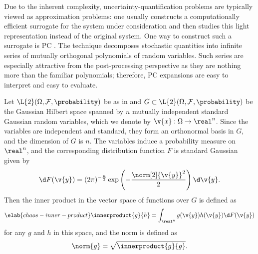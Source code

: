 Due to the inherent complexity, uncertainty-quantification problems are
typically viewed as approximation problems: one usually constructs a
computationally efficient surrogate for the system under consideration and then
studies this light representation instead of the original system. One way to
construct such a surrogate is \acf{PC} \cite{xiu2010}. The technique decomposes
stochastic quantities into infinite series of mutually orthogonal polynomials of
random variables. Such series are especially attractive from the post-processing
perspective as they are nothing more than the familiar polynomials; therefore,
\ac{PC} expansions are easy to interpret and easy to evaluate.

Let $\L{2}(\Omega, \mathcal{F}, \probability)$ be as in
 and $G \subset \L{2}(\Omega, \mathcal{F},
\probability)$ be the Gaussian Hilbert space \cite{janson1997} spanned by $n$
mutually independent standard Gaussian random variables, which we denote by
$\v{x}: \Omega \to \real^n$. Since the variables are independent and standard,
they form an orthonormal basis in $G$, and the dimension of $G$ is $n$. The
variables induce a probability measure on $\real^n$, and the corresponding
distribution function $F$ is standard Gaussian given by
\[
  \d F(\v{y}) = (2 \pi)^{-\frac{n}{2}} \exp\left(-\frac{\norm[2]{\v{y}}^2}{2}\right) \d \v{y}.
\]
Then the inner product in the vector space of functions over $G$ is defined as
\begin{equation} \elab{chaos-inner-product}
  \innerproduct{g}{h} = \int_{\real^n} g(\v{y}) h(\v{y}) \d F(\v{y})
\end{equation}
for any $g$ and $h$ in this space, and the norm is defined as
\[
  \norm{g} = \sqrt{\innerproduct{g}{g}}.
\]

